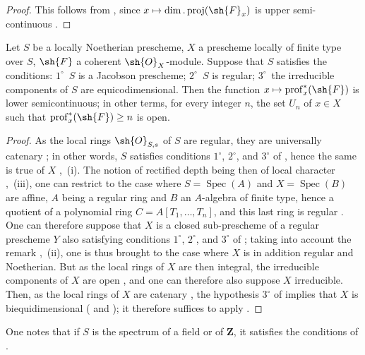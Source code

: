 \begin{proof}
This follows from , since $x\mapsto\dim.\operatorname{proj}(\sh{F}_x)$ is upper semi-continuous .
\end{proof}

\begin{proposition}[10.8.5]
\label{IV.10.8.5}
Let $S$ be a locally Noetherian prescheme, $X$ a prescheme locally of finite type over $S$, $\sh{F}$ a coherent $\sh{O}_X$-module.
Suppose that $S$ satisfies the conditions: $1^\circ$~$S$ is a Jacobson prescheme; $2^\circ$~$S$ is regular; $3^\circ$~the irreducible components of $S$ are equicodimensional.
Then the function $x\mapsto\operatorname{prof}^*_x(\sh{F})$ is lower semicontinuous; in other terms, for every integer $n$, the set $U_n$ of $x\in X$ such that $\operatorname{prof}^*_x(\sh{F})\geq n$ is open.
\end{proposition}

\begin{proof}
As the local rings $\sh{O}_{S,s}$ of $S$ are regular, they are universally catenary ; in other words, $S$ satisfies conditions $1^\circ$, $2^\circ$, and $3^\circ$ of , hence the same is true of $X$ ,~(i).
The notion of rectified depth being then of local character ,~(iii), one can restrict to the case where $S=\operatorname{Spec}(A)$ and $X=\operatorname{Spec}(B)$ are affine, $A$ being a regular ring and $B$ an $A$-algebra of finite type, hence a quotient of a polynomial ring $C=A[T_1,\ldots,T_n]$, and this last ring is regular .
One can therefore suppose that $X$ is a closed sub-prescheme of a regular prescheme $Y$ also satisfying conditions $1^\circ$, $2^\circ$, and $3^\circ$ of ; taking into account the remark ,~(ii), one is thus brought to the case where $X$ is in addition regular and Noetherian.
But as the local rings of $X$ are then integral, the irreducible components of $X$ are
open , and one can therefore also suppose $X$ irreducible.
Then, as the local rings of $X$ are catenary , the hypothesis $3^\circ$ of  implies that $X$ is biequidimensional ( and ); it therefore suffices to apply .
\end{proof}

One notes that if $S$ is the spectrum of a field or of $\mathbf{Z}$, it satisfies the conditions of .

